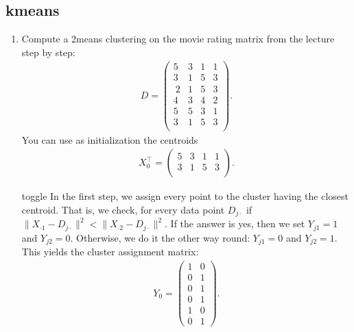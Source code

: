 \documentclass[letterpaper,10pt,english]{jupyterBook}
\begin{document}
\subsection{k\sphinxhyphen{}means}
\label{\detokenize{clustering_exercises:k-means}}\begin{enumerate}
%
\item {} 
\sphinxAtStartPar
Compute a 2\sphinxhyphen{}means clustering on the movie rating matrix from the lecture step by step:
\begin{align*}
         D = \begin{pmatrix}
        5 & 3 & 1 & 1 \\
        3 & 1 & 5 & 3  \\\
        2 & 1 & 5 & 3 \\
        4 & 3 & 4 & 2\\
        5 & 5 & 3 & 1 \\
        3 & 1 & 5 & 3 \\
      \end{pmatrix}.
    \end{align*}
\sphinxAtStartPar
You can use as initialization the centroids
\begin{align*}
        X_0^\top = \begin{pmatrix}
            5 & 3 & 1 & 1\\
            3 & 1 & 5 & 3\\
        \end{pmatrix}.
    \end{align*}
\begin{sphinxuseclass}{toggle}
\sphinxAtStartPar
In the first step, we assign every point to the cluster having the closest centroid. That is, we check, for every data point \(D_{j\cdot}\) if \(\lVert X_{\cdot 1} - D_{j\cdot}\rVert^2 < \lVert X_{\cdot 2} - D_{j\cdot}\rVert^2 \). If the answer is yes, then we set \(Y_{j1}=1\) and \(Y_{j2}=0\). Otherwise, we do it the other way round: \(Y_{j1}=0\) and \(Y_{j2}=1\). This yields the cluster assignment matrix:
\begin{align*}
    Y_0 = 
    \begin{pmatrix}
    1 & 0\\
    0 & 1\\
    0 & 1\\
    0 & 1\\
    1 & 0\\
    0 & 1
    \end{pmatrix}.
\end{align*}

\end{sphinxuseclass}
\end{enumerate}
\end{document}
